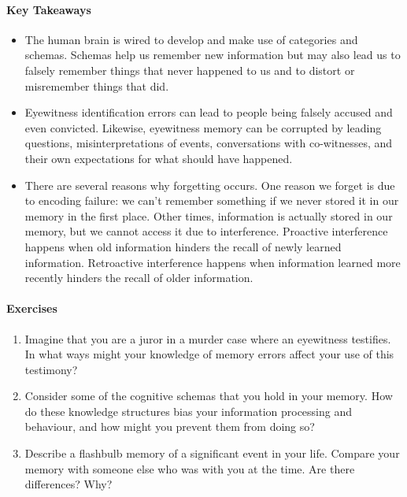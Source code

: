 \documentclass[
]{krantz}
\providecommand{\tightlist}{%
  \setlength{\itemsep}{0pt}\setlength{\parskip}{0pt}}
\begin{document}
\paragraph*{Key Takeaways}\label{key-takeaways-5}

\begin{itemize}
\tightlist
\item
  The human brain is wired to develop and make use of categories and schemas. Schemas help us remember new information but may also lead us to falsely remember things that never happened to us and to distort or misremember things that did.
\item
  Eyewitness identification errors can lead to people being falsely accused and even convicted. Likewise, eyewitness memory can be corrupted by leading questions, misinterpretations of events, conversations with co-witnesses, and their own expectations for what should have happened.
\item
  There are several reasons why forgetting occurs. One reason we forget is due to encoding failure: we can't remember something if we never stored it in our memory in the first place. Other times, information is actually stored in our memory, but we cannot access it due to interference. Proactive interference happens when old information hinders the recall of newly learned information. Retroactive interference happens when information learned more recently hinders the recall of older information.
\end{itemize}

\paragraph*{Exercises}\label{exercises-5}

\begin{enumerate}
\def\labelenumi{\arabic{enumi}.}
\tightlist
\item
  Imagine that you are a juror in a murder case where an eyewitness testifies. In what ways might your knowledge of memory errors affect your use of this testimony?
\item
  Consider some of the cognitive schemas that you hold in your memory. How do these knowledge structures bias your information processing and behaviour, and how might you prevent them from doing so?
\item
  Describe a flashbulb memory of a significant event in your life. Compare your memory with someone else who was with you at the time. Are there differences? Why?
\end{enumerate}
\end{document}
